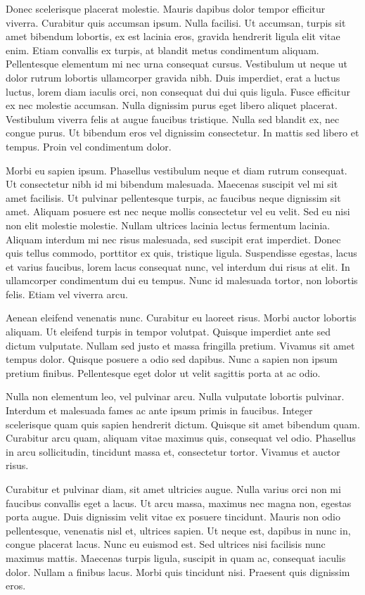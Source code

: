 \documentclass[12pt,a4paper]{article}
\begin{document}
Donec scelerisque placerat molestie. Mauris dapibus dolor tempor efficitur viverra. Curabitur quis accumsan ipsum. Nulla facilisi. Ut accumsan, turpis sit amet bibendum lobortis, ex est lacinia eros, gravida hendrerit ligula elit vitae enim. Etiam convallis ex turpis, at blandit metus condimentum aliquam. Pellentesque elementum mi nec urna consequat cursus. Vestibulum ut neque ut dolor rutrum lobortis ullamcorper gravida nibh. Duis imperdiet, erat a luctus luctus, lorem diam iaculis orci, non consequat dui dui quis ligula. Fusce efficitur ex nec molestie accumsan. Nulla dignissim purus eget libero aliquet placerat. Vestibulum viverra felis at augue faucibus tristique. Nulla sed blandit ex, nec congue purus. Ut bibendum eros vel dignissim consectetur. In mattis sed libero et tempus. Proin vel condimentum dolor.

Morbi eu sapien ipsum. Phasellus \cite{trzy}vestibulum neque et diam rutrum consequat. Ut consectetur nibh id mi bibendum malesuada. Maecenas suscipit vel mi sit amet facilisis. Ut pulvinar pellentesque turpis, ac faucibus neque dignissim sit amet. Aliquam posuere est nec neque mollis consectetur vel eu velit. Sed eu nisi non elit molestie molestie. Nullam ultrices lacinia lectus fermentum lacinia. Aliquam interdum mi nec risus malesuada, sed suscipit erat imperdiet. Donec quis tellus commodo, porttitor ex quis, tristique ligula. Suspendisse egestas, lacus et varius faucibus, lorem lacus consequat nunc, vel interdum dui risus at elit. In ullamcorper condimentum dui eu tempus. Nunc id malesuada tortor, non lobortis felis. Etiam vel viverra arcu.

Aenean eleifend venenatis nunc. Curabitur eu laoreet risus. Morbi auctor lobortis aliquam. Ut eleifend turpis in tempor volutpat. Quisque imperdiet ante sed dictum vulputate. Nullam sed justo et massa fringilla pretium. Vivamus sit amet tempus dolor. Quisque posuere a odio sed dapibus. Nunc a sapien non ipsum pretium finibus. Pellentesque eget dolor ut velit sagittis porta at ac odio.

Nulla non elementum leo, vel pulvinar arcu. Nulla vulputate lobortis pulvinar. Interdum et malesuada fames ac ante ipsum primis in faucibus. Integer scelerisque quam quis sapien hendrerit dictum. Quisque sit amet bibendum quam. Curabitur arcu quam, aliquam vitae maximus quis, consequat vel odio. Phasellus in arcu sollicitudin, tincidunt massa et, consectetur tortor. Vivamus et auctor risus.

Curabitur et pulvinar diam, sit amet ultricies augue. Nulla varius orci non mi faucibus convallis eget a lacus. Ut arcu massa, maximus nec magna non, egestas porta augue. Duis dignissim velit vitae ex posuere tincidunt. Mauris non odio pellentesque, venenatis nisl et, ultrices sapien. Ut neque est, dapibus in nunc in, congue placerat lacus. Nunc eu euismod est. Sed ultrices nisi facilisis nunc maximus mattis. Maecenas turpis ligula, suscipit in quam ac, consequat iaculis dolor. Nullam a finibus lacus. Morbi quis tincidunt nisi. Praesent quis dignissim eros.
\end{document}
